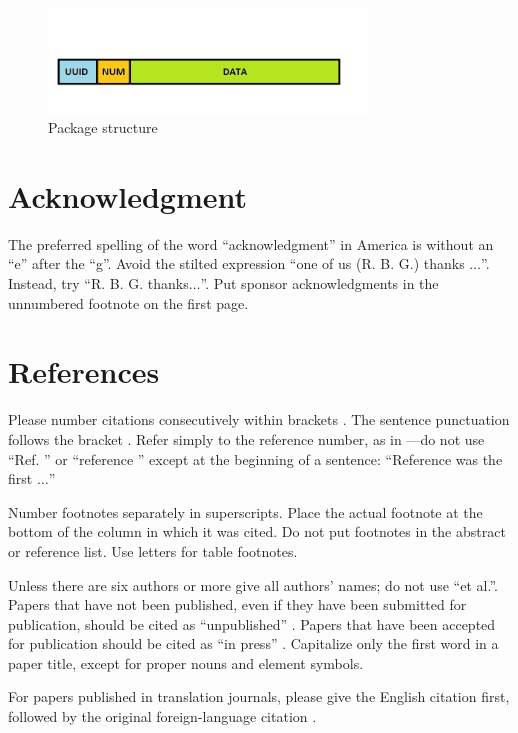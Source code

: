 \documentclass[conference]{IEEEtran}
\begin{document}
\begin{figure}[h]
    \centering
    \includegraphics[width=8.5cm]{./pics/Package structure.png}
    \caption{Package structure}
\end{figure}

\section*{Acknowledgment}

The preferred spelling of the word ``acknowledgment'' in America is without
an ``e'' after the ``g''. Avoid the stilted expression ``one of us (R. B.
G.) thanks $\ldots$''. Instead, try ``R. B. G. thanks$\ldots$''. Put sponsor
acknowledgments in the unnumbered footnote on the first page.

\section*{References}

Please number citations consecutively within brackets \cite{b1}. The
sentence punctuation follows the bracket \cite{b2}. Refer simply to the reference
number, as in \cite{b3}---do not use ``Ref. \cite{b3}'' or ``reference \cite{b3}'' except at
the beginning of a sentence: ``Reference \cite{b3} was the first $\ldots$''

Number footnotes separately in superscripts. Place the actual footnote at
the bottom of the column in which it was cited. Do not put footnotes in the
abstract or reference list. Use letters for table footnotes.

Unless there are six authors or more give all authors' names; do not use
``et al.''. Papers that have not been published, even if they have been
submitted for publication, should be cited as ``unpublished'' \cite{b4}. Papers
that have been accepted for publication should be cited as ``in press'' \cite{b5}.
Capitalize only the first word in a paper title, except for proper nouns and
element symbols.

For papers published in translation journals, please give the English
citation first, followed by the original foreign-language citation \cite{b6}.
\end{document}
